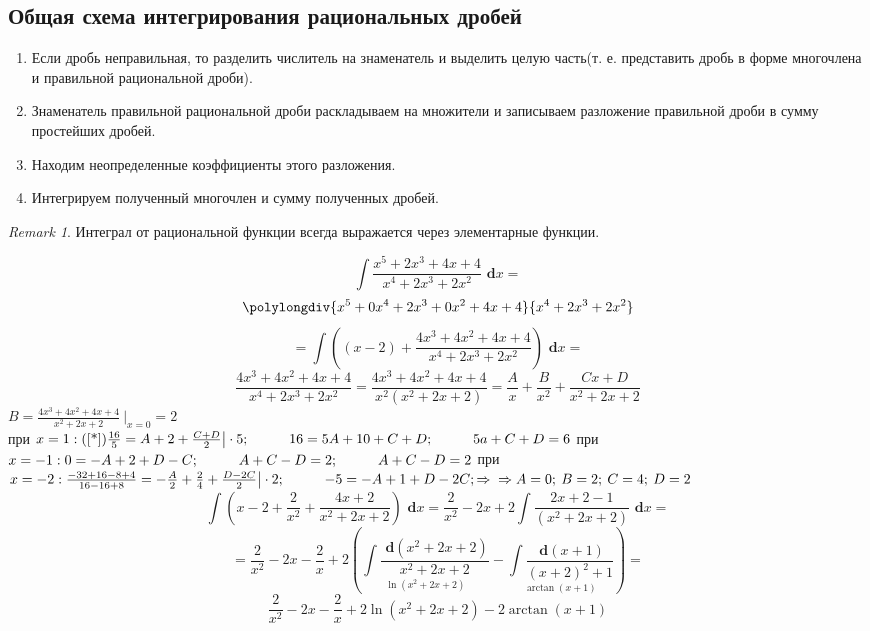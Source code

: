 \documentclass[a4paper,12pt]{bookest}
\theoremstyle{remark}
\newtheorem*{remark}{Remark}
\newcommand\tab[1][1cm]{\hspace*{#1}}
\newcommand\dx{\textbf{ d}x}
\newcommand\dy{\textbf{ d}}
\begin{document}
\subsection{Общая схема интегрирования рациональных дробей}
\begin{enumerate}
	\item Если дробь неправильная, то разделить числитель на знаменатель и выделить целую часть(т. е. представить дробь в форме многочлена и правильной рациональной дроби).
	\item Знаменатель правильной рациональной дроби раскладываем на множители и записываем разложение правильной дроби в сумму простейших дробей.
	\item Находим неопределенные коэффициенты этого разложения.
	\item Интегрируем полученный многочлен и сумму полученных дробей.	  
\end{enumerate}
\begin{remark}
Интеграл от рациональной функции всегда выражается через элементарные функции.	
\end{remark}
\begin{example}
	$$\int \frac{x^5+2x^3+4x+4}{x^4+2x^3+2x^2}\dx=$$
		\[
    		\polylongdiv{x^5+0x^4+2x^3+0x^2+4x+4}{x^4+2x^3+2x^2}
  		\]
	$$=\int \left((x-2)+\frac{4x^3+4x^2+4x+4}{x^4+2x^3+2x^2}\right)\dx=$$
	\begin{equation}\label{*}
		\frac{4x^3+4x^2+4x+4}{x^4+2x^3+2x^2}=\frac{4x^3+4x^2+4x+4}{x^2(x^2+2x+2)}=\frac Ax+\frac B{x^2}+\frac{Cx+D}{x^2+2x+2}
	\end{equation}
	$
	B=\frac{4x^3+4x^2+4x+4}{x^2+2x+2}\>\bigg|_{x=0}=2
	$\\ при $x=1:(\ref{*})\\ \frac {16}{5}=A+2+\frac{C+D}{2}\big|\cdot 5;\tab  16=5A+10+C+D; \tab 5a+C+D=6\\\\$
	при $x=-1:\\ 0= -A+2+D-C;\tab A+C-D=2;\tab A+C-D=2\\\\$
	при $x=-2:\\ \frac{-32+16-8+4}{16-16+8}=-\frac A2+\frac24+\frac{D-2C}{2}\big|\cdot2;\tab -5=-A+1+D-2C;\Rightarrow\\\\\Rightarrow A=0;\>B=2;\>C=4;\>D=2$
	$$\int \left(x-2 +\frac2{x^2}+\frac{4x+2}{x^2+2x+2} \right)\dx=\frac2{x^2}-2x+2\int \frac{2x+2-1}{(x^2+2x+2)}\dx=$$
	$$=\frac2{x^2}-2x-\frac2x+2\left(\underset{\ln(x^2+2x+2)}{\int \frac{\dy (x^2+2x+2)}{x^2+2x+2}}-\underset{\arctan (x+1)}{\int\frac{\dy (x+1)}{(x+2)^2+1}}\right)=$$
	$$\frac2{x^2}-2x-\frac2x+2\ln(x^2+2x+2)-2\arctan (x+1)$$
\end{example}
\end{document}
